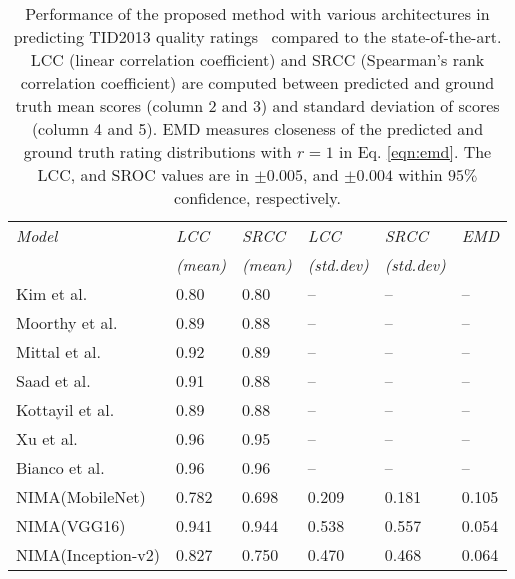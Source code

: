 \documentclass[10pt,twocolumn,twoside]{IEEEtran}
\begin{document}
\begin{table}[!t]
\vspace{0 mm}
\begin{center}
\captionsetup{width=0.49\textwidth}
\caption{Performance of the proposed method with various architectures in predicting TID2013 quality ratings~\cite{ponomarenko2013color} compared to the state-of-the-art. LCC (linear correlation coefficient) and SRCC (Spearman's rank correlation coefficient) are computed between predicted and ground truth mean scores (column 2 and 3) and standard deviation of scores (column 4 and 5). EMD measures closeness of the predicted and ground truth rating distributions with $r=1$ in Eq. \ref{eqn:emd}. The LCC, and SROC values are in  $\pm0.005$, and $\pm0.004$ within $95\%$ confidence, respectively.}
\begin{tabular}{@{} *6l @{}}    \toprule
\emph{Model} & \emph{LCC} & \emph{SRCC} & \emph{LCC} & \emph{SRCC} & \emph{EMD} \\
  & \emph{(mean)} & \emph{(mean)} & \emph{(std.dev)} & \emph{(std.dev)}\\\midrule
 Kim et al.  \cite{kim2017deep} & 0.80 & 0.80 & -- & -- & -- \\
Moorthy et al. \cite{moorthy2011blind}    &  0.89  &  0.88 &  --  &  -- &  --   \\ 
Mittal et al. \cite{mittal2012no}    &  0.92  &  0.89  &  --  &  --  &  --  \\ 
Saad et al. \cite{saad2012blind}   &  0.91  &  0.88  &  --  &  --  &  --  \\ 
Kottayil et al. \cite{kottayil2016color}    &  0.89  &  0.88  &  --  &  --  &  --  \\ 
Xu et al. \cite{xu2016blind}    &  0.96  &  0.95  &  --  &  -- &  --   \\ 
Bianco et al. \cite{bianco2016use}   &  0.96  &  0.96  &  --  &  --  &  --  \\ \hdashline
NIMA(MobileNet)  & 0.782 & 0.698 &  0.209 &  0.181 &  0.105 \\
NIMA(VGG16)  & 0.941& 0.944 &  0.538 &  0.557 &  0.054 \\
NIMA(Inception-v2)  & 0.827 & 0.750 &  0.470 &  0.468 &  0.064 \\\bottomrule
 \hline
\end{tabular}
\label{tab:tid_comp}
\end{center}
\vspace{-5 mm}
\end{table}
\end{document}
